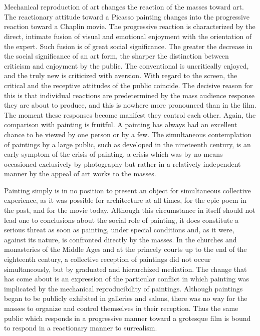 \documentclass[11pt, letterpaper]{article}
\begin{document}
\section{}

Mechanical reproduction of art changes the reaction of the masses toward art.
The reactionary attitude toward a Picasso painting changes into the progressive
reaction toward a Chaplin movie. The progressive reaction is characterized by
the direct, intimate fusion of visual and emotional enjoyment with the
orientation of the expert. Such fusion is of great social significance. The
greater the decrease in the social significance of an art form, the sharper the
distinction between criticism and enjoyment by the public. The conventional is
uncritically enjoyed, and the truly new is criticized with aversion. With
regard to the screen, the critical and the receptive attitudes of the public
coincide. The decisive reason for this is that individual reactions are
predetermined by the mass audience response they are about to produce, and this
is nowhere more pronounced than in the film. The moment these responses become
manifest they control each other. Again, the comparison with painting is
fruitful. A painting has always had an excellent chance to be viewed by one
person or by a few. The simultaneous contemplation of paintings by a large
public, such as developed in the nineteenth century, is an early symptom of the
crisis of painting, a crisis which was by no means occasioned exclusively by
photography but rather in a relatively independent manner by the appeal of art
works to the masses.

Painting simply is in no position to present an object for simultaneous
collective experience, as it was possible for architecture at all times, for
the epic poem in the past, and for the movie today. Although this circumstance
in itself should not lead one to conclusions about the social role of painting,
it does constitute a serious threat as soon as painting, under special
conditions and, as it were, against its nature, is confronted directly by the
masses. In the churches and monasteries of the Middle Ages and at the princely
courts up to the end of the eighteenth century, a collective reception of
paintings did not occur simultaneously, but by graduated and hierarchized
mediation. The change that has come about is an expression of the particular
conflict in which painting was implicated by the mechanical reproducibility of
paintings. Although paintings began to be publicly exhibited in galleries and
salons, there was no way for the masses to organize and control themselves in
their reception. Thus the same public which responds in a progressive manner
toward a grotesque film is bound to respond in a reactionary manner to
surrealism.
\end{document}
